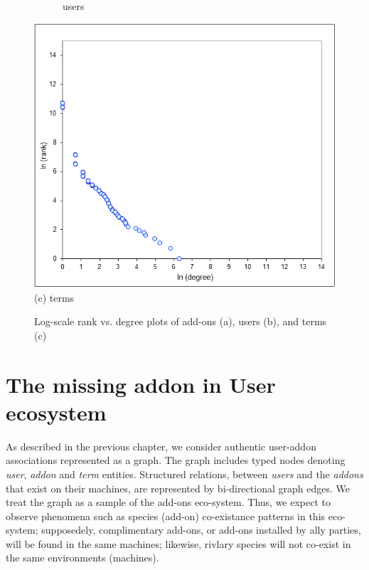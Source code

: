 \documentclass[11pt,oneside]{book}
\begin{document}
\begin{figure}[t]
\begin{subfigure}[b]{0.49\textwidth}
\caption{users}
\end{subfigure}
	\centering
\includegraphics[scale=0.48]{figures/zipf-terms.png} \\
(c) terms \\
\caption{Log-scale rank vs. degree plots of add-ons (a), users (b), and terms (c)}
	\label{fig:minlen2noremove}
\end{figure}

\chapter{The missing addon in User ecosystem}
\label{chap:user_ecosystem}

As described in the previous chapter, we consider authentic user-addon
associations represented as a graph.  The graph includes typed nodes
denoting {\it user}, {\it addon} and {\it term} entities. Structured
relations, between {\it users} and the {\it addons} that exist on
their machines, are represented by bi-directional graph edges. We
treat the graph as a sample of the add-ons eco-system. Thus, we expect
to observe phenomena such as species (add-on) co-existance patterns in
this eco-system; supposedely, complimentary add-ons, or add-ons
installed by ally parties, will be found in the same machines;
likewise, rivlary species will not co-exist in the same environments
(machines).
\end{document}

